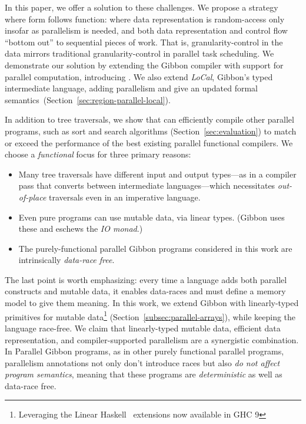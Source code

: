 \documentclass[acmsmall,acmthm=false,nonacm]{acmart}
\theoremstyle{straighttext0}
\theoremstyle{straighttext}
\newcommand{\Secref}[1]{Section~\ref{#1}}
\begin{document}
In this paper, we offer a solution to these challenges.
We propose a strategy where form follows function: where data
representation is random-access only insofar as parallelism is needed,
and both data representation and control flow ``bottom out'' to
sequential pieces of work.  That is, granularity-control in the data
mirrors traditional granularity-control in parallel task
scheduling. We demonstrate our solution by extending the Gibbon
compiler with support for parallel computation, introducing {\em \pargibbon}.
%
We also extend {\em LoCal}, Gibbon's typed intermediate language,
adding parallelism and give an updated formal
semantics~(\Secref{sec:region-parallel-local}).

In addition to tree traversals, we show that \pargibbon{} can efficiently
compile other parallel programs, such as sort and search algorithms
(\Secref{sec:evaluation}) to match or exceed the performance of the best
existing parallel functional compilers.  We choose a {\em functional} focus
for three primary reasons:

\begin{itemize}
\item Many tree traversals have different input and output types---as in
  a compiler pass that converts between intermediate languages---which necessitates 
  {\em out-of-place} traversals even in an imperative language.
\item Even pure programs can use mutable data, via linear
  types. (Gibbon uses these and eschews the {\em IO monad}.)
\item The purely-functional parallel Gibbon programs considered in this work are intrinsically
  {\em data-race free}.
\end{itemize}

The last point is worth emphasizing: every time a language adds both parallel
constructs and mutable data, it enables data-races and must define a memory
model to give them meaning.  In this work, we extend Gibbon with linearly-typed primitives for mutable data\footnote{Leveraging the Linear Haskell~\cite{linear-haskell}
extensions now available in GHC 9}
(\Secref{subsec:parallel-arrays}),
while keeping the language {race-free}.
%
We claim that linearly-typed mutable data, efficient data representation, and
compiler-supported parallelism are a synergistic combination.
%
In Parallel Gibbon programs, as in other
purely functional parallel programs, parallelism annotations not only don't
introduce races but also {\em do not affect program semantics},
meaning that these programs are {\em deterministic} as well as data-race free.
\end{document}
